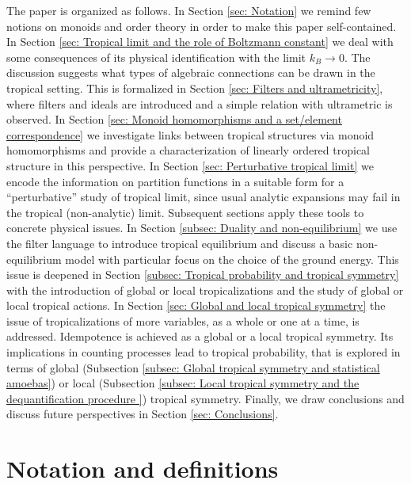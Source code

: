 \documentclass[11pt,british,reqno]{article}
\numberwithin{equation}{section}
\numberwithin{figure}{section}
\numberwithin{table}{section}
\theoremstyle{definition}
\theoremstyle{definition}
\theoremstyle{plain}
\theoremstyle{plain}
\theoremstyle{remark}
\theoremstyle{plain}
\numberwithin{equation}{section}
\numberwithin{figure}{section}
\numberwithin{table}{section}
\theoremstyle{plain}
\begin{document}
The paper is organized as follows. In Section \ref{sec: Notation} we remind few notions on monoids and order theory in order to make this paper self-contained. In Section \ref{sec: Tropical limit and the role of Boltzmann constant} we deal with some consequences of its physical identification with the limit $k_{B}\rightarrow0$. The discussion suggests what types of algebraic connections can be drawn in the tropical setting. This is formalized in Section \ref{sec: Filters and ultrametricity}, where filters and ideals are introduced and a simple relation with ultrametric is observed. In Section \ref{sec: Monoid homomorphisms and a set/element correspondence}
we investigate links between tropical structures via monoid homomorphisms and provide a characterization of linearly ordered tropical structure in this perspective. In Section \ref{sec: Perturbative tropical limit}
we encode the information on partition functions in a suitable
form for a ``perturbative'' study of tropical limit, since usual analytic expansions may fail in the tropical (non-analytic) limit. Subsequent sections apply these tools to concrete physical issues. In Section \ref{subsec: Duality and non-equilibrium} we use the filter language to introduce tropical equilibrium and discuss a basic non-equilibrium model with particular focus on the choice of the ground energy. This issue is deepened in Section \ref{subsec: Tropical probability and tropical symmetry} with the introduction of global
or local tropicalizations and the study of global or local tropical actions. In Section \ref{sec: Global and local tropical symmetry} the issue of tropicalizations of more variables, as a whole or one at a time, is addressed. Idempotence is achieved as a global or a local tropical symmetry. Its implications in counting processes lead to tropical probability, that is explored in terms of global (Subsection \ref{subsec: Global tropical symmetry and statistical amoebas}) or local (Subsection \ref{subsec: Local tropical symmetry and the dequantification procedure })
tropical symmetry. Finally, we draw conclusions and discuss future perspectives in Section \ref{sec: Conclusions}.  

\section{\label{sec: Notation} Notation and definitions}
\end{document}
